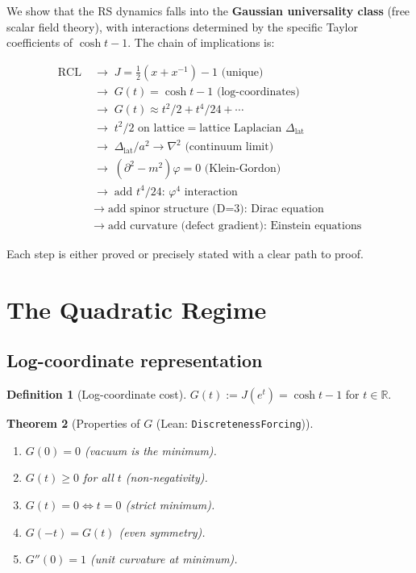 \documentclass[11pt,a4paper]{article}
\theoremstyle{plain}
\newtheorem{theorem}{Theorem}[section]
\theoremstyle{definition}
\newtheorem{definition}[theorem]{Definition}
\theoremstyle{remark}
\newcommand{\R}{\mathbb{R}}
\newcommand{\Jcost}{J}
\newcommand{\Jlog}{G}
\newcommand{\Lap}{\Delta_{\mathrm{lat}}}
\begin{document}
We show that the RS dynamics falls into the \textbf{Gaussian universality
class} (free scalar field theory), with interactions determined by the
specific Taylor coefficients of $\cosh t - 1$.  The chain of implications
is:

\[
\boxed{
\begin{aligned}
\text{RCL} &\;\to\; \Jcost = \tfrac12(x + x^{-1}) - 1 \text{ (unique)} \\
&\;\to\; \Jlog(t) = \cosh t - 1 \text{ (log-coordinates)} \\
&\;\to\; \Jlog(t) \approx t^2/2 + t^4/24 + \cdots \\
&\;\to\; t^2/2 \text{ on lattice} = \text{lattice Laplacian } \Lap \\
&\;\to\; \Lap / a^2 \to \nabla^2 \text{ (continuum limit)} \\
&\;\to\; (\partial^2 - m^2)\varphi = 0 \text{ (Klein-Gordon)} \\
&\;\to\; \text{add } t^4/24 \text{: } \varphi^4 \text{ interaction} \\
&\;\to\; \text{add spinor structure (D=3): Dirac equation} \\
&\;\to\; \text{add curvature (defect gradient): Einstein equations}
\end{aligned}
}
\]

Each step is either proved or precisely stated with a clear path to proof.

\section{The Quadratic Regime}
\label{sec:quadratic}

\subsection{Log-coordinate representation}

\begin{definition}[Log-coordinate cost]
$\Jlog(t) := \Jcost(e^t) = \cosh t - 1$ for $t \in \R$.
\end{definition}

\begin{theorem}[Properties of $\Jlog$ {\normalfont (Lean: \texttt{DiscretenessForcing})}]
\label{thm:Jlog-props}
\begin{enumerate}[nosep,label=(\alph*)]
\item $\Jlog(0) = 0$ \;(vacuum is the minimum).
\item $\Jlog(t) \geq 0$ for all $t$ \;(non-negativity).
\item $\Jlog(t) = 0 \iff t = 0$ \;(strict minimum).
\item $\Jlog(-t) = \Jlog(t)$ \;(even symmetry).
\item $\Jlog''(0) = 1$ \;(unit curvature at minimum).
\end{enumerate}
\end{theorem}
\end{document}
